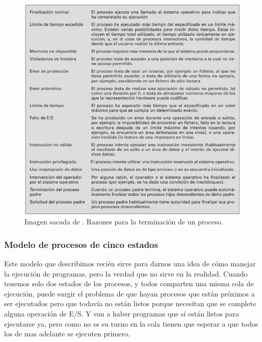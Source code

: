 \documentclass[12pt]{article}
\begin{document}
  \begin{figure}[H]
    \centering
    \includegraphics[width=0.9\linewidth]{imagenes/terminacion-proceso.png}
    \caption{Imagen sacada de \parencite{sostallings}. Razones para la terminación de un proceso.}
    \label{fig:terminacion-proceso}
  \end{figure}

  \subsubsection{Modelo de procesos de cinco estados}
  Este modelo que describimos recién sirve para darnos una idea de cómo manejar la ejecución de programas, pero la verdad que no sirve en la realidad. Cuando tenemos solo dos estados de los procesos, y todos comparten una misma cola de ejecución, puede surgir el problema de que hayan procesos que están próximos a ser ejecutados pero que todavía no están listos porque necesitan que se complete alguna operación de E/S. Y van a haber programas que sí están listos para ejecutarse ya, pero como no es su turno en la cola tienen que esperar a que todos los de mas adelante se ejecuten primero. 
\end{document}
